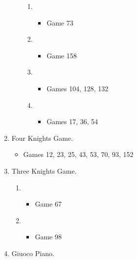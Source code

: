 \begin{enumerate}
\begin{enumerate}
\begin{enumerate}
\item {}
\begin{itemize}
\item Game 73
\end{itemize}

\item {}
\begin{itemize}
\item Game 158
\end{itemize}

\item {}
\begin{itemize}
\item Games 104, 128, 132
\end{itemize}

\item {}
\begin{itemize}
\item Games 17, 36, 54
\end{itemize}

\end{enumerate}
\end{enumerate}

\item Four Knights Game. \\
\newgame{}
\begin{itemize}
\item Games 12, 23, 25, 43, 53, 70, 93, 152
\end{itemize}

\item Three Knights Game. \\
\newgame{}
\begin{enumerate}
\item {}
\begin{itemize}
\item Game 67
\end{itemize}
\item {}
\begin{itemize}
\item Game 98
\end{itemize}
\end{enumerate}

\item Giuoco Piano. \\
\newgame{}

\end{enumerate}
